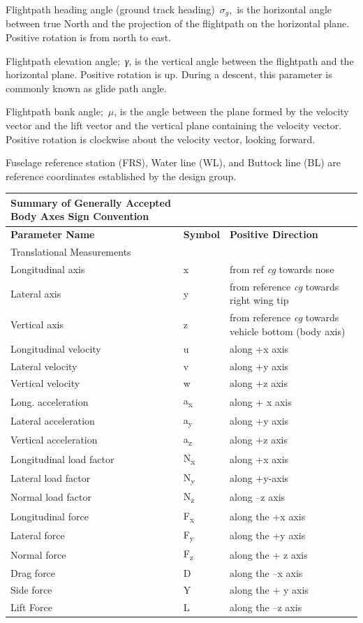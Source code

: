 \documentclass[
]{book}
\begin{document}
Flightpath heading angle (ground track heading)~\(\sigma_g\),~is the horizontal angle between true North and the projection of the flightpath on the horizontal plane. Positive rotation is from north to east.

Flightpath elevation angle;~\emph{γ}, is the vertical angle between the flightpath and the horizontal plane. Positive rotation is up. During a descent, this parameter is commonly known as glide path angle.

Flightpath bank angle;~\(\mu\), is the angle between the plane formed by the velocity vector and the lift vector and the vertical plane containing the velocity vector. Positive rotation is clockwise about the velocity vector, looking forward.

Fuselage reference station (FRS), Water line (WL), and Buttock line (BL) are reference coordinates established by the design group.

\begin{longtable}[]{@{}lll@{}}
\toprule
\textbf{Summary of Generally Accepted Body Axes Sign Convention} & &\tabularnewline
\midrule
\endhead
\textbf{Parameter Name} & \textbf{Symbol} & \textbf{Positive Direction}\tabularnewline
Translational Measurements & &\tabularnewline
Longitudinal axis & x & from ref \emph{cg} towards nose\tabularnewline
Lateral axis & y & from reference \emph{cg} towards right wing tip\tabularnewline
Vertical axis & z & from reference \emph{cg} towards vehicle bottom (body axis)\tabularnewline
Longitudinal velocity & u & along +x axis\tabularnewline
Lateral velocity & v & along +y axis\tabularnewline
Vertical velocity & w & along +z axis\tabularnewline
Long. acceleration & a\textsubscript{x} & along + x axis\tabularnewline
Lateral acceleration & a\textsubscript{y} & along +y axis\tabularnewline
Vertical acceleration & a\textsubscript{z} & along +z axis\tabularnewline
Longitudinal load factor & N\textsubscript{x} & along +x axis\tabularnewline
Lateral load factor & N\textsubscript{y} & along +y-axis\tabularnewline
Normal load factor & N\textsubscript{z} & along --z axis\tabularnewline
Longitudinal force & F\textsubscript{x} & along the +x axis\tabularnewline
Lateral force & F\textsubscript{y} & along the +y axis\tabularnewline
Normal force & F\textsubscript{z} & along the + z axis\tabularnewline
Drag force & D & along the --x axis\tabularnewline
Side force & Y & along the + y axis\tabularnewline
Lift Force & L & along the --z axis\tabularnewline
\bottomrule
\end{longtable}
\end{document}
